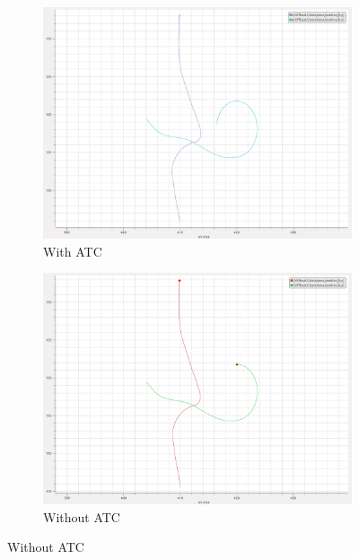          \begin{figure}[H]
        \centering
        
            \begin{subfigure}[b]{0.45\textwidth}
                \centering
                \includegraphics[width=\textwidth]{figs/plot_crossingLeft_E.png}
                \caption{With \ac{ATC}}
                \label{fig:plot_crossingLeft_E}
            \end{subfigure}
            \begin{subfigure}[b]{0.45\textwidth}
                \centering
                \includegraphics[width=\textwidth]{figs/plot_noATC_crossingLeft_E.png}
                \caption{Without \ac{ATC}}
                \label{fig:plot_noATC_crossingLeft_E}
            \end{subfigure}
            

\end{figure}
